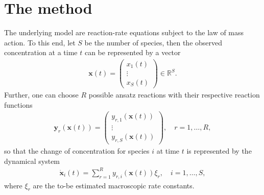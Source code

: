 \documentclass[oneside, abstracton, titlepage]{scrartcl}
\begin{document}
	\section{The method}
	The underlying model are reaction-rate equations subject to the law of mass action. To this end, let $S$ be the number of species, then the observed concentration at a time $t$ can be represented by a vector
	\begin{align}
	\mathbf{x}(t)=\begin{pmatrix}
	x_1(t)\\ \vdots \\ x_S(t)
	\end{pmatrix}\in \mathbb{R}^S.
	\end{align}
	Further, one can choose $R$ possible ansatz reactions with their respective reaction functions
	\begin{align}
	\textbf{y}_r(\textbf{x}(t))=\begin{pmatrix}
	y_{r,1}(\textbf{x}(t)) \\ \vdots \\ y_{r,S}(\textbf{x}(t))
	\end{pmatrix},\quad r=1,\ldots,R,
	\end{align}
	so that the change of concentration for species $i$ at time $t$ is represented by the dynamical system
	\begin{align}
	\dot{\textbf{x}}_i(t) = \sum_{r=1}^{R}y_{r,i}(\textbf{x}(t))\xi_r,\quad i=1,\ldots, S,
	\label{method:the-system}\end{align}
	where $\xi_r$ are the to-be estimated macroscopic rate constants.
\end{document}

